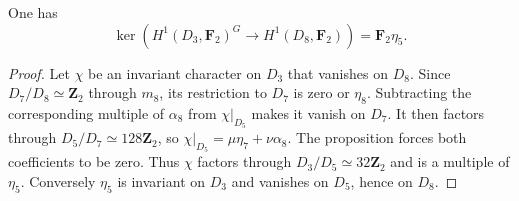 \begin{corollary}\label{cor:d3-character-kernel-d8}
One has
\[
 \ker\!\left(H^1(D_3,\mathbf F_2)^G
                    \longrightarrow H^1(D_8,\mathbf F_2)\right)
       =\mathbf F_2\eta_5.
\]
\end{corollary}
\begin{proof}
Let $\chi$ be an invariant character on $D_3$ that vanishes on $D_8$.
Since $D_7/D_8\simeq\mathbf Z_2$ through $m_8$, its restriction
to $D_7$ is zero or $\eta_8$. Subtracting the corresponding multiple
of $\alpha_8$ from $\chi|_{D_5}$ makes it vanish on $D_7$.
It then factors through $D_5/D_7\simeq128\mathbf Z_2$, so
$\chi|_{D_5}=\mu\eta_7+\nu\alpha_8$.
The proposition forces both coefficients to be zero.
Thus $\chi$ factors through $D_3/D_5\simeq32\mathbf Z_2$ and is
a multiple of $\eta_5$. Conversely $\eta_5$ is invariant on $D_3$
and vanishes on $D_5$, hence on $D_8$.
\end{proof}
